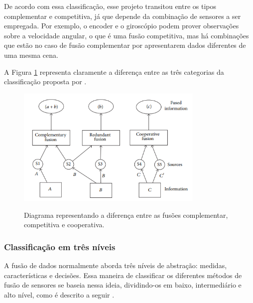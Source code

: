 \documentclass[acronym, symbols, table, deposito]{fei}
\begin{document}
				De acordo com essa classificação, esse projeto transitou entre os tipos complementar e competitiva, já que depende da combinação de sensores a ser empregada. Por exemplo, o encoder e o giroscópio podem prover observações sobre a velocidade angular, o que é uma fusão competitiva, mas há combinações que estão no caso de fusão complementar por apresentarem dados diferentes de uma mesma cena.
			
				A Figura \ref{fig:classificacao_fusao_de_sensores} representa claramente a diferença entre as três categorias da classificação proposta por \textcite{castanedo2013review}.
			
				\begin{figure}[!htb]
					\centering
					\caption{Diagrama representando a diferença entre as fusões complementar, competitiva e cooperativa.} 
					\includegraphics[width=0.8\textwidth]{classificacao_fusao_de_sensores.png}
					\label{fig:classificacao_fusao_de_sensores}
				\end{figure}
			
			\subsubsection{Classificação em três níveis}
			
				A fusão de dados normalmente aborda três níveis de abstração: medidas, características e decisões. Essa maneira de classificar os diferentes métodos de fusão de sensores se baseia nessa ideia, dividindo-os em baixo, intermediário e alto nível, como é descrito a seguir \cite{castanedo2013review}.
			
\end{document}
